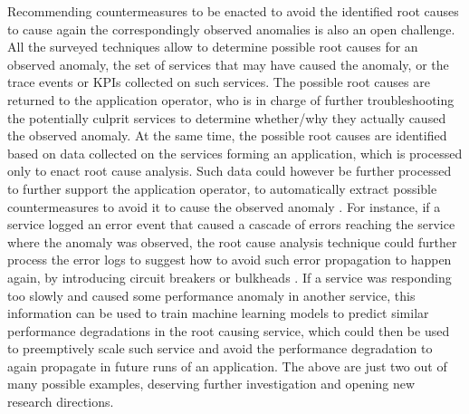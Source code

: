 Recommending countermeasures to be enacted to avoid the identified root causes to cause again the correspondingly observed anomalies is also an open challenge.
All the surveyed techniques allow to determine possible root causes for an observed anomaly, \viz the set of services that may have caused the anomaly, or the trace events or KPIs collected on such services. 
The possible root causes are returned to the application operator, who is in charge of further troubleshooting the potentially culprit services to determine whether/why they actually caused the observed anomaly.
At the same time, the possible root causes are identified based on data collected on the services forming an application, which is processed only to enact root cause analysis.
Such data could however be further processed to further support the application operator, \eg to automatically extract possible countermeasures to avoid it to cause the observed anomaly \cite{Brogi2020_FailureCausalities}.
For instance, if a service logged an error event that caused a cascade of errors reaching the service where the anomaly was observed, the root cause analysis technique could further process the error logs to suggest how to avoid such error propagation to happen again, \eg by introducing circuit breakers or bulkheads \cite{Richardson2018_MicroservicesPatterns}.
If a service was responding too slowly and caused some performance anomaly in another service, this information can be used to train machine learning models to predict similar performance degradations in the root causing service, which could then be used to preemptively scale such service and avoid the performance degradation to again propagate in future runs of an application.
The above are just two out of many possible examples, deserving further investigation and opening new research directions. 